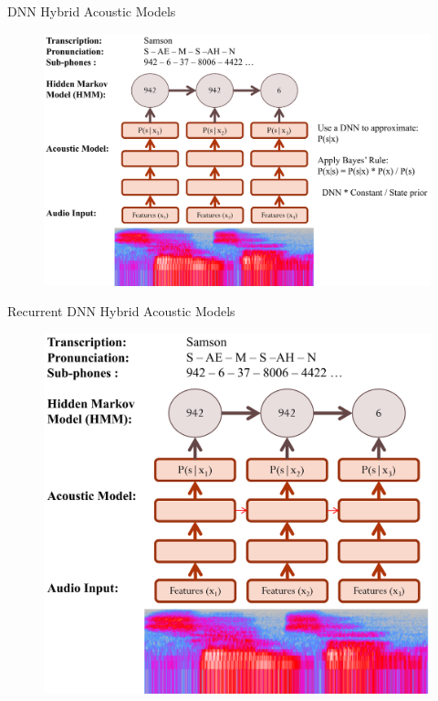 \documentclass[10pt]{beamer}
\begin{document}
\begin{frame}[fragile]{DNN Hybrid Acoustic Models}
\begin{figure}
\includegraphics[height=0.8\textheight]{./images/page-071.png}
\end{figure}
\end{frame}

\begin{frame}[fragile]{Recurrent DNN Hybrid Acoustic Models}
\begin{figure}
\includegraphics[height=0.8\textheight]{./images/page-09.png}
\end{figure}
\end{frame}
\end{document}
